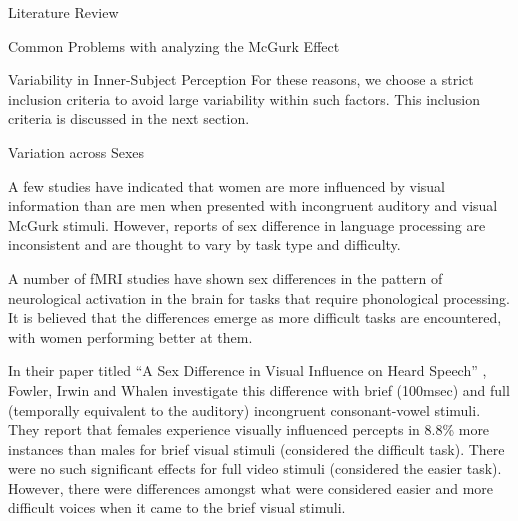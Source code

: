 \documentclass{article}
\begin{document}
\begin{psection}{Literature Review}
\begin{psubsection}{Common Problems with analyzing the McGurk Effect}
\begin{pssubsection}{Variability in Inner-Subject Perception}
			For these reasons, we choose a strict inclusion criteria to avoid large variability within such factors. This inclusion criteria is discussed in the next section.

		\end{pssubsection}

	\end{psubsection}

	\begin{psubsection}{Variation across Sexes}

		A few studies have indicated that women are more influenced by visual information than are men when presented with incongruent auditory and visual McGurk stimuli. However, reports of sex difference in language processing are inconsistent and are thought to vary by task type and difficulty. 

		A number of fMRI studies have shown sex differences in the pattern of neurological activation in the brain for tasks that require phonological processing. It is believed that the differences emerge as more difficult tasks are encountered, with women performing better at them.

		In their paper titled ``A Sex Difference in Visual Influence on Heard Speech'' \cite{sex difference}, Fowler, Irwin and Whalen investigate this difference with brief (100msec) and full (temporally equivalent to the auditory) incongruent consonant-vowel stimuli. They report that females experience visually influenced percepts in 8.8\% more instances than males for brief visual stimuli (considered the difficult task). There were no such significant effects for full video stimuli (considered the easier task). However, there were differences amongst what were considered easier and more difficult voices when it came to the brief visual stimuli. 

	\end{psubsection}

\end{psection}
\end{document}
